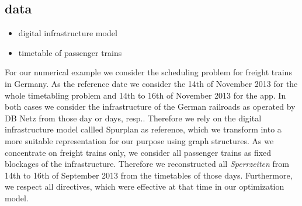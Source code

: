 \subsection{data}
\begin{itemize}
  \item digital infrastructure model
  \item timetable of passenger trains
\end{itemize}
For our numerical example we consider the scheduling problem for freight trains in Germany. As the reference date we consider the 14th of November 2013 for the whole timetabling problem and 14th to 16th of November 2013 for the app. In both cases we consider the infrastructure of the German railroads as operated by DB Netz from those day or days, resp.. Therefore we rely on the digital infrastructure model callled Spurplan as reference, which we transform into a more suitable representation for our purpose using graph structures. As we concentrate on freight trains only, we consider all passenger trains as fixed blockages of the infrastructure. Therefore we reconstructed all \textit{Sperrzeiten} from 14th to 16th of September 2013 from the timetables of those days. Furthermore, we respect all directives, which were effective at that time in our optimization model.
